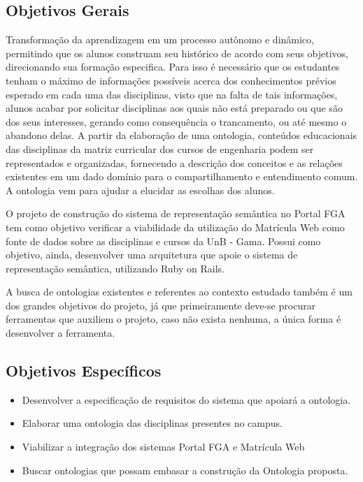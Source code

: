
\subsection{Objetivos Gerais}

Transformação da aprendizagem em um processo autônomo e dinâmico, permitindo que os alunos construam seu histórico de acordo com seus objetivos, direcionando sua formação especifica. Para isso é necessário que os estudantes tenham o máximo de informações possíveis acerca dos conhecimentos prévios esperado em cada uma das disciplinas, visto que na falta de tais informações, alunos acabar por solicitar disciplinas aos quais não está preparado ou que são dos seus interesses, gerando como consequência o trancamento, ou até mesmo o abandono delas. A partir da elaboração de uma ontologia, conteúdos educacionais das disciplinas da matriz curricular dos cursos de engenharia podem ser representados e organizadas, fornecendo a descrição dos conceitos e as relações existentes em um dado domínio para o compartilhamento e entendimento comum. A ontologia vem para ajudar a elucidar as escolhas dos alunos.

O projeto de construção do sistema de representação semântica no Portal FGA tem como objetivo verificar a viabilidade da utilização do Matrícula Web como fonte de dados sobre as disciplinas e cursos da UnB - Gama. Possui como objetivo, ainda, desenvolver uma arquitetura que apoie o sistema de representação semântica, utilizando Ruby on Rails.

A busca de ontologias existentes e referentes ao contexto estudado também é um dos grandes objetivos do projeto, já que primeiramente deve-se procurar ferramentas que auxiliem o projeto, caso não exista nenhuma, a única forma é desenvolver a ferramenta.

\subsection{Objetivos Específicos}

	\begin{itemize}
		\item Desenvolver a especificação de requisitos do sistema que apoiará a ontologia.

		\item Elaborar uma ontologia das disciplinas presentes no campus.

		\item Viabilizar a integração dos sistemas Portal FGA e Matrícula Web

		\item Buscar ontologias que possam embasar a construção da Ontologia proposta.

	\end{itemize}